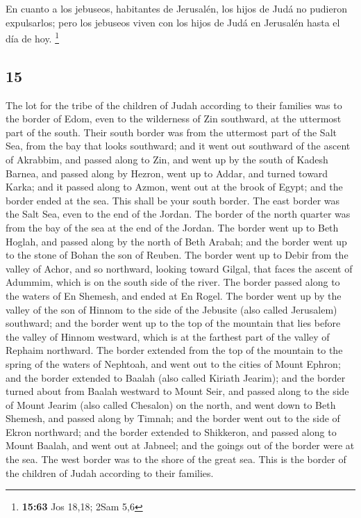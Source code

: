 \begin{paracol}{2}
 En cuanto a los jebuseos, habitantes de Jerusalén, los
hijos de Judá no pudieron expulsarlos; pero los jebuseos viven con los
hijos de Judá en Jerusalén hasta el día de hoy. \footnote{\textbf{15:63}
  Jos 18,18; 2Sam 5,6}

\switchcolumn
\begin{otherlanguage}{english}

\hypertarget{section-29}{%
\section{15}\label{section-29}}

 The lot for the tribe of the children of Judah according
to their families was to the border of Edom, even to the wilderness of
Zin southward, at the uttermost part of the south.  Their
south border was from the uttermost part of the Salt Sea, from the bay
that looks southward;  and it went out southward of the
ascent of Akrabbim, and passed along to Zin, and went up by the south of
Kadesh Barnea, and passed along by Hezron, went up to Addar, and turned
toward Karka;  and it passed along to Azmon, went out at
the brook of Egypt; and the border ended at the sea. This shall be your
south border.  The east border was the Salt Sea, even to
the end of the Jordan. The border of the north quarter was from the bay
of the sea at the end of the Jordan.  The border went up
to Beth Hoglah, and passed along by the north of Beth Arabah; and the
border went up to the stone of Bohan the son of Reuben. 
The border went up to Debir from the valley of Achor, and so northward,
looking toward Gilgal, that faces the ascent of Adummim, which is on the
south side of the river. The border passed along to the waters of En
Shemesh, and ended at En Rogel.  The border went up by the
valley of the son of Hinnom to the side of the Jebusite (also called
Jerusalem) southward; and the border went up to the top of the mountain
that lies before the valley of Hinnom westward, which is at the farthest
part of the valley of Rephaim northward.  The border
extended from the top of the mountain to the spring of the waters of
Nephtoah, and went out to the cities of Mount Ephron; and the border
extended to Baalah (also called Kiriath Jearim);  and the
border turned about from Baalah westward to Mount Seir, and passed along
to the side of Mount Jearim (also called Chesalon) on the north, and
went down to Beth Shemesh, and passed along by Timnah; 
and the border went out to the side of Ekron northward; and the border
extended to Shikkeron, and passed along to Mount Baalah, and went out at
Jabneel; and the goings out of the border were at the sea.
 The west border was to the shore of the great sea. This
is the border of the children of Judah according to their families.


\end{otherlanguage}
\end{paracol}
